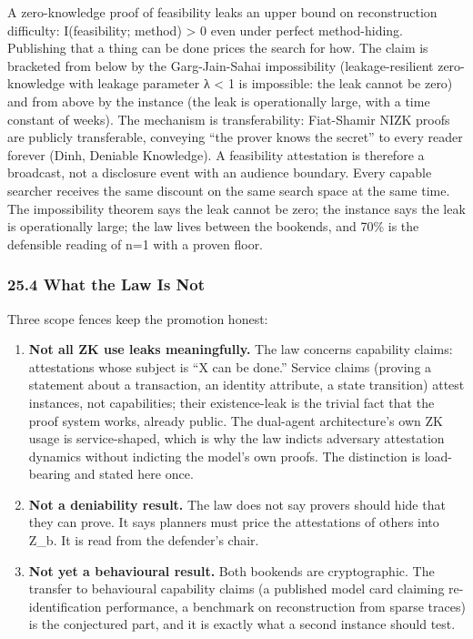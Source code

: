 \documentclass[
]{article}
\providecommand{\tightlist}{%
  \setlength{\itemsep}{0pt}\setlength{\parskip}{0pt}}
\begin{document}
A zero-knowledge proof of feasibility leaks an upper bound on
reconstruction difficulty: I(feasibility; method) \textgreater{} 0 even
under perfect method-hiding. Publishing that a thing can be done prices
the search for how. The claim is bracketed from below by the
Garg-Jain-Sahai impossibility (leakage-resilient zero-knowledge with
leakage parameter λ \textless{} 1 is impossible: the leak cannot be
zero) and from above by the instance (the leak is operationally large,
with a time constant of weeks). The mechanism is transferability:
Fiat-Shamir NIZK proofs are publicly transferable, conveying ``the
prover knows the secret'' to every reader forever (Dinh, Deniable
Knowledge). A feasibility attestation is therefore a broadcast, not a
disclosure event with an audience boundary. Every capable searcher
receives the same discount on the same search space at the same time.
The impossibility theorem says the leak cannot be zero; the instance
says the leak is operationally large; the law lives between the
bookends, and 70\% is the defensible reading of n=1 with a proven floor.

\subsubsection{25.4 What the Law Is Not}\label{what-the-law-is-not}

Three scope fences keep the promotion honest:

\begin{enumerate}
\def\labelenumi{\arabic{enumi}.}
\tightlist
\item
  \textbf{Not all ZK use leaks meaningfully.} The law concerns
  capability claims: attestations whose subject is ``X can be done.''
  Service claims (proving a statement about a transaction, an identity
  attribute, a state transition) attest instances, not capabilities;
  their existence-leak is the trivial fact that the proof system works,
  already public. The dual-agent architecture's own ZK usage is
  service-shaped, which is why the law indicts adversary attestation
  dynamics without indicting the model's own proofs. The distinction is
  load-bearing and stated here once.
\item
  \textbf{Not a deniability result.} The law does not say provers should
  hide that they can prove. It says planners must price the attestations
  of others into Z\_b. It is read from the defender's chair.
\item
  \textbf{Not yet a behavioural result.} Both bookends are
  cryptographic. The transfer to behavioural capability claims (a
  published model card claiming re-identification performance, a
  benchmark on reconstruction from sparse traces) is the conjectured
  part, and it is exactly what a second instance should test.
\end{enumerate}
\end{document}
